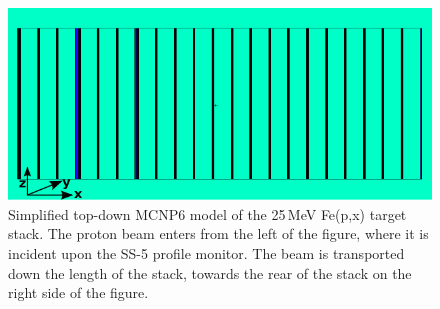 \begin{figure}
 \centering
 \includegraphics[trim = 0mm 0mm 2mm 0mm, clip,width=0.75\columnwidth]{./figures/88_25MeV_stack_nolabels_axes.png}
\caption{Simplified top-down MCNP6 model of the 25\,MeV  Fe(p,x) target stack. The  proton beam enters from the left of the figure, where it is incident upon the SS-5 profile monitor. The beam is transported down the length of the stack, towards the rear of the stack on the right side of the figure.
}
 \label{fig:fe_vised_25}
\end{figure}




% 
% 
% 
% 



